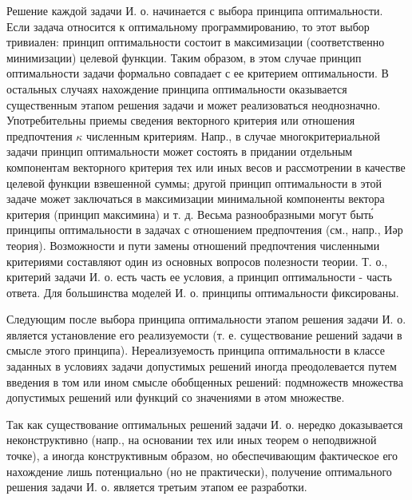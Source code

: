 \documentclass[10pt]{article}
\begin{document}
Решение каждой задачи И. о. начинается с выбора принципа оптимальности. Если задача относится к оптимальному программированию, то этот выбор тривиален: принцип оптимальности состоит в максимизации (соответственно минимизации) целевой функции. Таким образом, в этом случае принцип оптимальности задачи формально совпадает с ее критерием оптимальности. В остальных случаях нахождение принципа оптимальности оказывается существенным этапом решения задачи и может реализоваться неоднозначно. Употребительны приемы сведения векторного критерия или отношения предпочтения $\kappa$ численным критериям. Напр., в случае многокритериальной задачи принцип оптимальности может состоять в придании отдельным компонентам векторного критерия тех или иных весов и рассмотрении в качестве целевой функции взвешенной суммы; другой принцип оптимальности в этой задаче может заключаться в максимизации минимальной компоненты вектора критерия (принцип максимина) и т. д. Весьма разнообразными могут быть́ принципы оптимальности в задачах с отношением предпочтения (см., напр., Иәр теория). Возможности и пути замены отношений предпочтения численными критериями составляют один из основных вопросов полезности теории. Т. о., критерий задачи И. о. есть часть ее условия, а принцип оптимальности - часть ответа. Для большинства моделей И. о. принципы оптимальности фиксированы.



Следующим после выбора принципа оптимальности этапом решения задачи И. о. является установление его реализуемости (т. е. существование решений задачи в смысле этого принципа). Нереализуемость принципа оптимальности в классе заданных в условиях задачи допустимых решений иногда преодолевается путем введения в том или ином смысле обобщенных решений: подмножеств множества допустимых решений или функций со значениями в әтом множестве.



Так как существование оптимальных решений задачи И. о. нередко доказывается неконструктивно (напр., на основании тех или иных теорем о неподвижной точке), а иногда конструктивным образом, но обеспечивающим фактическое его нахождение лишь потенциально (но не практически), получение оптимального решения задачи И. о. является третьим этапом ее разработки.
\end{document}
